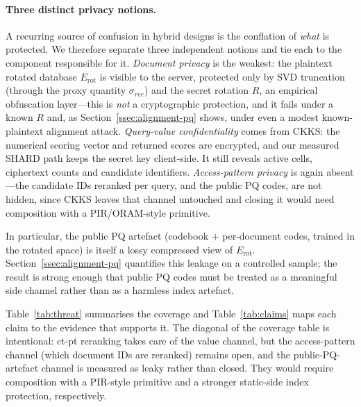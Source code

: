 \paragraph{Three distinct privacy notions.} A recurring source of
confusion in hybrid designs is the conflation of \emph{what} is
protected. We therefore separate three independent notions and tie each to the
component responsible for it. \emph{Document privacy} is the weakest: the
plaintext rotated database $E_{\mathrm{rot}}$ is visible to the server,
protected only by SVD truncation (through the proxy quantity $\sigma_{rec}$)
and the secret rotation $R$, an empirical obfuscation layer---this is
\emph{not} a cryptographic protection, and it fails under a known $R$ and, as
Section~\ref{ssec:alignment-pq} shows, under even a modest known-plaintext
alignment attack. \emph{Query-value confidentiality} comes from CKKS: the
numerical scoring vector and returned scores are encrypted, and our measured
SHARD path keeps the secret key client-side. It still reveals active cells,
ciphertext counts and candidate identifiers. \emph{Access-pattern
privacy} is again absent---the candidate IDs reranked per query, and the
public PQ codes, are not hidden, since CKKS leaves that channel untouched and
closing it would need composition with a PIR/ORAM-style primitive.

In particular, the public PQ artefact (codebook + per-document codes,
trained in the rotated space) is itself a lossy compressed view of
$E_{\mathrm{rot}}$. Section~\ref{ssec:alignment-pq} quantifies this
leakage on a controlled sample; the result is strong enough that public
PQ codes must be treated as a meaningful side channel rather than as a
harmless index artefact.

Table~\ref{tab:threat} summarises the coverage and
Table~\ref{tab:claims} maps each claim to the evidence that supports it.
The diagonal of the coverage table is intentional: ct-pt reranking takes
care of the value channel, but the access-pattern channel (which document
IDs are reranked) remains open, and the public-PQ-artefact channel is
measured as leaky rather than closed. They would require composition with
a PIR-style primitive and a stronger static-side index protection,
respectively.

